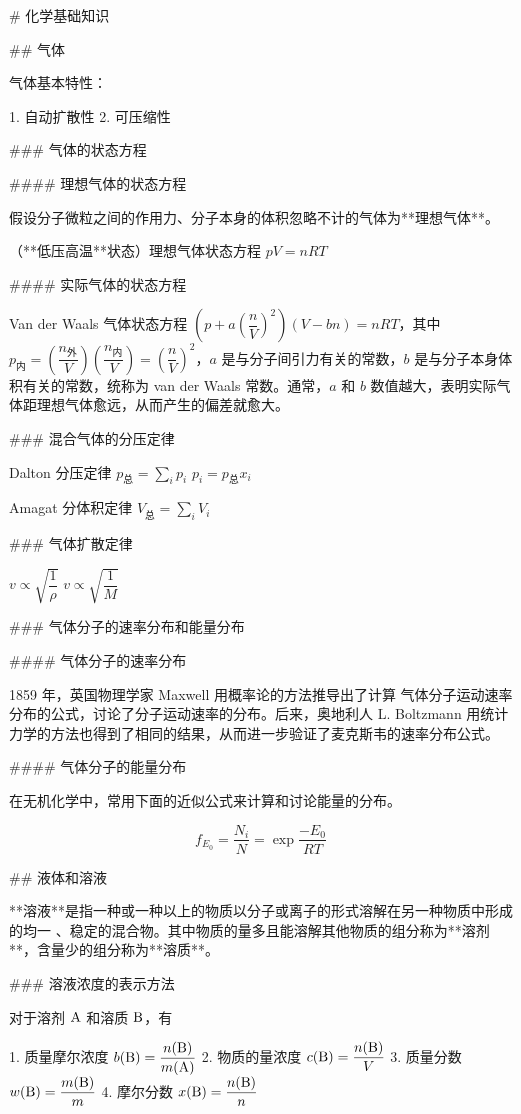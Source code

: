 # 化学基础知识

## 气体

气体基本特性：

1. 自动扩散性
2. 可压缩性

### 气体的状态方程

#### 理想气体的状态方程

假设分子微粒之间的作用力、分子本身的体积忽略不计的气体为**理想气体**。

（**低压高温**状态）理想气体状态方程 $pV=nRT$

#### 实际气体的状态方程

Van der Waals 气体状态方程 $\left(p+a\left({\dfrac{n}{V}}\right)^2\right)(V-bn)=nRT$，其中 $p_内=\left(\dfrac{n_外}{V}\right)\left(\dfrac{n_内}{V}\right)=\left(\dfrac{n}{V}\right)^2$，$a$ 是与分子间引力有关的常数，$b$ 是与分子本身体积有关的常数，统称为 van der Waals 常数。通常，$a$ 和 $b$ 数值越大，表明实际气体距理想气体愈远，从而产生的偏差就愈大。

### 混合气体的分压定律

Dalton 分压定律 $\displaystyle p_总=\sum_ip_i$
$p_i=p_总x_i$

Amagat 分体积定律 $\displaystyle V_总=\sum_iV_i$

### 气体扩散定律

$v \propto \sqrt{\dfrac{1}{\rho}}$
$v \propto \sqrt{\dfrac{1}{M}}$

### 气体分子的速率分布和能量分布

#### 气体分子的速率分布

1859 年，英国物理学家 Maxwell 用概率论的方法推导出了计算 气体分子运动速率分布的公式，讨论了分子运动速率的分布。后来，奥地利人 L. Boltzmann 用统计力学的方法也得到了相同的结果，从而进一步验证了麦克斯韦的速率分布公式。

#### 气体分子的能量分布

在无机化学中，常用下面的近似公式来计算和讨论能量的分布。

$$
f_{E_0}=\dfrac{N_i}{N}=\exp{\dfrac{-E_0}{RT}}
$$

## 液体和溶液

**溶液**是指一种或一种以上的物质以分子或离子的形式溶解在另一种物质中形成的均一 、稳定的混合物。其中物质的量多且能溶解其他物质的组分称为**溶剂**，含量少的组分称为**溶质**。

### 溶液浓度的表示方法

对于溶剂 $\rm A$ 和溶质 $\rm B$，有

1. 质量摩尔浓度 $b({\rm B})=\dfrac{n({\rm B})}{m({\rm A})}$
2. 物质的量浓度 $c({\rm B})=\dfrac{n({\rm B})}{V}$
3. 质量分数 $w({\rm B})=\dfrac{m({\rm B})}{m}$
4. 摩尔分数 $x({\rm B})=\dfrac{n({\rm B})}{n}$

